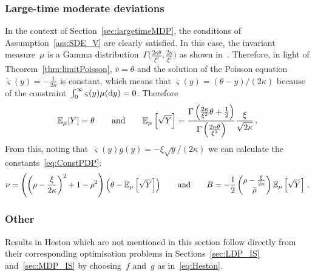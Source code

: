 \subsubsection{Large-time moderate deviations} 
In the context of Section~\ref{sec:largetimeMDP}, 
the conditions of Assumption~\ref{ass:SDE_V} are clearly satisfied. 
In this case, the invariant measure~$\mu$ is a Gamma distribution~$\Gamma\big(\frac{2\kappa\theta}{\xi^2}, \frac{2\kappa}{\xi^2}\big)$ 
as shown in~\cite[Section~3.]{Cox1985ARates}.
Therefore, in light of Theorem~\ref{thm:limitPoisson}, 
$\overline{v} = \theta$ and the solution of the Poisson equation~$\dot{\varsigma}(y)=-\frac{1}{2\kappa}$ is constant, which means
that
$\varsigma(y) = (\theta-y)/(2\kappa)$
because of the constraint~$\int_{0}^{\infty}\varsigma(y)\mu(\mathrm{d} y)=0$.
Therefore 
$$
\mathbb{E}_\mu[Y] = \theta
\qquad\text{and}\qquad
\mathbb{E}_\mu\left[\sqrt{Y}\right]
=\frac{\Gamma\left( \frac{2\kappa}{\xi^2}\theta + \frac{1}{2} \right )}{\Gamma\left( \frac{2\kappa\theta}{\xi^2} \right )} \frac{\xi}{\sqrt{2\kappa}}\,.
$$
From this, noting that~$\dot{\varsigma}(y)g(y) = -\xi\sqrt{y}/(2\kappa)$ we can calculate the constants~\eqref{eq:ConstPDP}:
\begin{align*}
\nu = \left( \left( \rho - \frac{\xi}{2\kappa} \right)^2 + 1-\rho^2 \right)\left( \theta - \mathbb{E}_\mu\left[\sqrt{Y}\right]\right)
\qquad \text{and} \qquad
B = -\frac{1}{2}
\begin{pmatrix}
\rho - \frac{\xi}{2\kappa}\\
\overline{\rho}\\
\end{pmatrix}\mathbb{E}_\mu\left[\sqrt{Y}\right]\,.
\end{align*}

\subsubsection{Other}
Results in Heston which are not mentioned in this section follow directly from their corresponding optimisation problems in Sections~\ref{sec:LDP_IS} and~\ref{sec:MDP_IS} by choosing~$f$ and~$g$ as in~\eqref{eq:Heston}.

